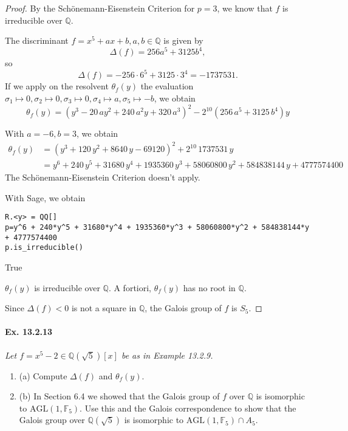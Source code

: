 \documentclass[11pt,a4paper]{article}
\newcommand{\be} {\begin{enumerate}}
\newcommand{\ee} {\end{enumerate}}
\newcommand{\Q}{\mathbb{Q}}
\newcommand{\F}{\mathbb{F}}
\begin{document}
\begin{proof}
By the Sch\"onemann-Eisenstein Criterion for $p=3$, we know that $f$ is irreducible over $\Q$.

The discriminant $f = x^5 +ax+b, a,b\in \Q$ is given by
$$\Delta(f) = 256a^5+3125b^4,$$
so 
$$\Delta(f) = -256 \cdot 6^5 + 3125 \cdot 3^4 = -1737531.$$
If we apply on the resolvent $\theta_f(y)$ the evaluation $\sigma_1\mapsto 0, \sigma_2\mapsto 0, \sigma_3\mapsto 0, \sigma_4 \mapsto a, \sigma_5 \mapsto -b$, we obtain
$$\theta_f(y) =  {\left(y^{3} - 20 \, a y^{2}  + 240 \,a^{2} y + 320 \, a^{3} \right)}^{2} - 2^{10}(256 \, a^{5}  + 3125 \, b^{4}) y $$

With $a = -6, b = 3$, we obtain
\begin{align*}
\theta_f(y) &={\left(y^{3} + 120 \, y^{2} + 8640 \, y - 69120\right)}^{2} + 2^{10}\, 1737531 \, y\\
&= y^{6} + 240 \, y^{5} + 31680 \, y^{4} + 1935360 \, y^{3} + 58060800 \,
y^{2} + 584838144 \, y + 4777574400
\end{align*}
The Sch\"onemann-Eisenstein Criterion doesn't apply.  

With Sage, we obtain
\begin{verbatim}
R.<y> = QQ[]
p=y^6 + 240*y^5 + 31680*y^4 + 1935360*y^3 + 58060800*y^2 + 584838144*y + 4777574400
p.is_irreducible()
\end{verbatim}
\begin{center}
True
\end{center}

$\theta_f(y)$ is irreducible over $\Q$. A fortiori, $\theta_f(y)$ has no root in $\Q$.

Since $\Delta(f)<0$ is not a square in $\Q$, the Galois group of $f$ is $S_5$.
\end{proof}

\paragraph{Ex. 13.2.13}

{\it Let $f = x^5 - 2 \in \Q(\sqrt{5})[x]$ be as in Example 13.2.9.
\be
\item[(a)] Compute $\Delta(f)$ and $\theta_f(y)$.
\item[(b)] In Section 6.4 we showed that the Galois group of $f$ over $\Q$ is isomorphic to $\mathrm{AGL}(1,\F_5)$. Use this and the Galois correspondence to show that the Galois group over $\Q(\sqrt{5})$ is isomorphic to $\mathrm{AGL}(1,\F_5) \cap A_5$.
\ee
}
\end{document}
